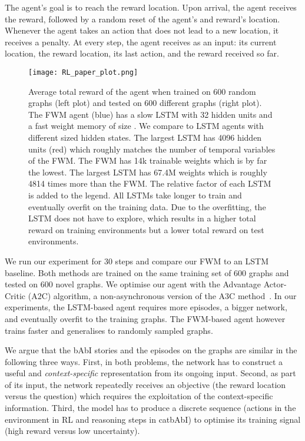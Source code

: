 \documentclass{article} \usepackage{iclr2021_conference,times}
\begin{document}
The agent's goal is to reach the reward location.
Upon arrival, the agent receives the reward, followed by a random reset of the agent's and reward's location.
Whenever the agent takes an action that does not lead to a new location, it receives a penalty.
At every step, the agent receives as an input: its current location, the reward location, its last action, and the reward received so far. 
\begin{figure}[h]
  \centering
\texttt{[image: RL\_paper\_plot.png]}
\caption{
  Average total reward of the agent when trained on 600 random graphs (left plot) and tested on 600 different graphs (right plot).
  The FWM agent (blue) has a slow LSTM with 32 hidden units and a fast weight memory of size . 
  We compare to LSTM agents with different sized hidden states. 
  The largest LSTM has 4096 hidden units (red) which roughly matches the number of temporal variables of the FWM.
  The FWM has 14k trainable weights which is by far the lowest. 
  The largest LSTM has 67.4M weights which is roughly 4814 times more than the FWM.
  The relative factor of each LSTM is added to the legend.
  All LSTMs take longer to train and eventually overfit on the training data. 
  Due to the overfitting, the LSTM does not have to explore, which results in a higher total reward on training environments but a lower total reward on test environments.}
  \label{fig:RL}
  \vspace{-5pt}
\end{figure}

We run our experiment for 30 steps and compare our FWM to an LSTM baseline. 
Both methods are trained on the same training set of 600 graphs and tested on 600 novel graphs.
We optimise our agent with the Advantage Actor-Critic (A2C) algorithm, a non-asynchronous version of the A3C method~\citep{mnih2016asynchronous}.
In our experiments, the LSTM-based agent requires more episodes, a bigger network, and eventually overfit to the training graphs.
The FWM-based agent however trains faster and generalises to randomly sampled graphs. 

We argue that the bAbI stories and the episodes on the graphs are similar in the following three ways. 
First, in both problems, the network has to construct a useful and \textit{context-specific} representation from its ongoing input. 
Second, as part of its input, the network repeatedly receives an objective (the reward location versus the question) which requires the exploitation of the context-specific information. 
Third, the model has to produce a discrete sequence (actions in the environment in RL and reasoning steps in catbAbI) to optimise its training signal (high reward versus low uncertainty).
\end{document}
